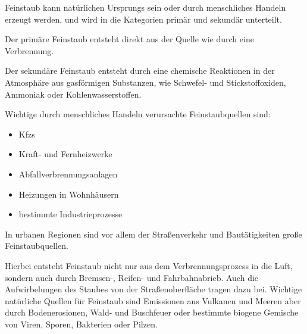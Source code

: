Feinstaub kann natürlichen Ursprungs sein oder durch menschliches Handeln erzeugt werden,
und wird in die Kategorien primär und sekundär unterteilt.

Der primäre Feinstaub entsteht direkt aus der Quelle wie durch eine Verbrennung.  

Der sekundäre Feinstaub entsteht durch eine chemische Reaktionen in der Atmosphäre aus gasförmigen Substanzen, 
wie Schwefel- und Stickstoffoxiden, Ammoniak oder Kohlenwasserstoffen.

Wichtige durch menschliches Handeln verursachte Feinstaubquellen sind: 
\begin{itemize}
	\item \acfp{Kfz}
	\item Kraft- und Fernheizwerke
	\item Abfallverbrennungsanlagen
	\item Heizungen in Wohnhäusern
	\item bestimmte Industrieprozesse
\end{itemize}

In urbanen Regionen sind vor allem der Straßenverkehr und Bautätigkeiten große Feinstaubquellen.

Hierbei entsteht Feinstaub nicht nur aus dem Verbrennungsprozess in die Luft, sondern auch durch Bremsen-, Reifen- und Fahrbahnabrieb. 
Auch die Aufwirbelungen des Staubes von der Straßenoberfläche tragen dazu bei. 
Wichtige natürliche Quellen für Feinstaub sind Emissionen aus Vulkanen und Meeren aber durch Bodenerosionen, Wald- und Buschfeuer oder 
bestimmte biogene Gemische von Viren, Sporen, Bakterien oder Pilzen.